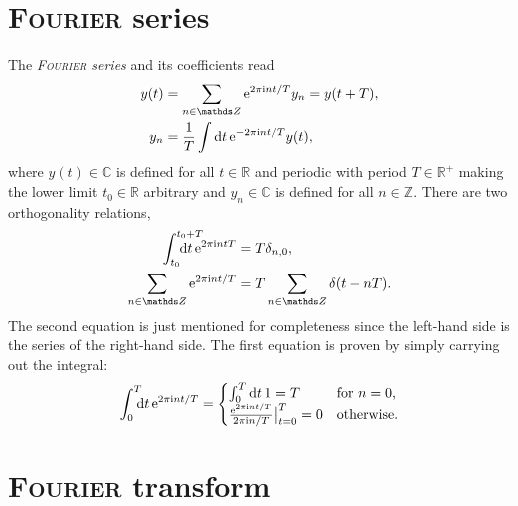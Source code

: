 \section{\textsc{Fourier} series}

The \emph{\textsc{Fourier} series} and its coefficients read
%
\begin{align*}
    y(t) &= \sum_{n \in \mathds Z} \E^{2 \pi \I n t / T} y_n = y(t + T), \\
    y_n &= \frac 1 T \int \D t \, \E^{-2 \pi \I n t / T} y(t),
\end{align*}
%
where $y(t) \in \mathds C$ is defined for all $t \in \mathds R$ and periodic
with period $T \in \mathds R^+$ making the lower limit $t_0 \in \mathds R$
arbitrary and $y_n \in \mathds C$ is defined for all $n \in \mathds Z$. There
are two orthogonality relations,
%
\begin{subequations}
    \begin{align}
        \label{Fourier series orthogonality relation}
        \int \from{t_0} \till{t_0 + T} \D t \, \E^{2 \pi \I n t T}
        &= T \delta_{n, 0},
        \\
        \label{Dirac comb}
        \sum_{n \in \mathds Z} \E^{2 \pi \I n t / T}
        &= T \sum_{n \in \mathds Z} \delta(t - n T).
    \end{align}
\end{subequations}
%
The second equation is just mentioned for completeness since the left-hand side
is the  series of the right-hand side. The first equation is
proven by simply carrying out the integral:
%
\begin{equation*}
    \int \from 0 \till T \D t \, \E^{2 \pi \I n t / T} =
    \begin{cases}
        \int_0^ T \D t \, 1 = T
            & \text{for $n = 0$,} \\
        \frac{\E^{2 \pi \I n t / T}}{2 \pi \I n / T} \big|_{t = 0}^T = 0
            & \text{otherwise.}
    \end{cases}
\end{equation*}

\section{\textsc{Fourier} transform}

